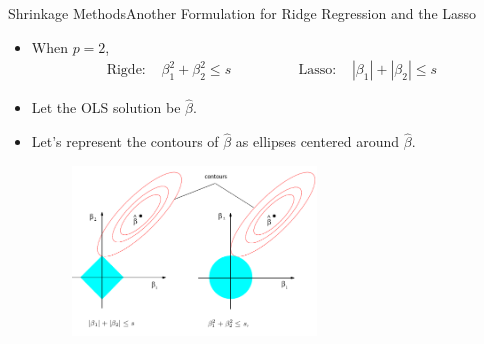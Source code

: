 \begin{frame}{Shrinkage Methods}{Another Formulation for Ridge Regression and the Lasso}

\begin{itemize}
    \item When $p=2$, \pause 
        \begin{equation}
        \begin{aligned}
            \text{Rigde: } &\beta_1^2 + \beta_2^2 \leq s \qquad\qquad&
            \text{Lasso: } &|\beta_1 | + |\beta_2 | \leq s
        \end{aligned}    
        \end{equation} \pause 
    \item Let the OLS solution be $\hat{\beta}$. \pause 
    \item Let's represent the contours of $\hat{\beta}$ as ellipses centered around $\hat{\beta}$. \pause
    
    \begin{figure}
        \centering
        \includegraphics[height=4.5cm]{shrinkage/ridge-lasso.png}
    \end{figure} 
    




\end{itemize}


\end{frame}
